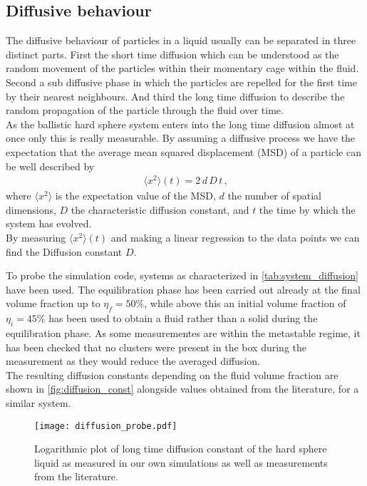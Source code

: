 \subsection{Diffusive behaviour}
\label{sec:diffusion_probe}
The diffusive behaviour of particles in a liquid usually can be separated in three distinct parts. First the short time diffusion which can be understood as the random movement of the particles within their momentary cage within the fluid. Second a sub diffusive phase in which the particles are repelled for the first time by their nearest neighbours. And third the long time diffusion to describe the random propagation of the particle through the fluid over time.\\
   
As the ballistic hard sphere system enters into the long time diffusion almost at once only this is really measurable. By assuming a diffusive process we have the expectation that the average mean squared displacement (MSD) of a particle can be well described by 
\begin{align}
\label{eqn:diffusion}
\langle x^2 \rangle(t) = 2 \, d \, D \, t  \, \text{,}
\end{align}
where $\langle x^2 \rangle$ is the expectation value of the MSD, $d$ the number of spatial dimensions, $D$ the characteristic diffusion constant, and $t$ the time by which the system has evolved.\\

By measuring $\langle x^2 \rangle (t)$ and making a linear regression to the data points we can find the Diffusion constant $D$.

To probe the simulation code, systems as characterized in \autoref{tab:system_diffusion} have been used. The equilibration phase has been carried out already at the final volume fraction up to $\eta_f = 50\%$, while above this an initial volume fraction of $\eta_i = 45\%$ has been used to obtain a fluid rather than a solid during the equilibration phase. As some measurementes are within the metastable regime, it has been checked that no clusters were present in the box during the measurement as they would reduce the averaged diffusion.\\

The resulting diffusion constants depending on the fluid volume fraction are shown in \autoref{fig:diffusion_const} alongside values obtained from the literature, for a similar system.\\

\begin{figure}[h]
\centering
\texttt{[image: diffusion\_probe.pdf]}
\caption[Longtime diffusion constant at varying volume fractions]{Logarithmic plot of long time diffusion constant of the hard sphere liquid as measured in our own simulations as well as measurements from the literature. }
\label{fig:diffusion_const}
\end{figure}

